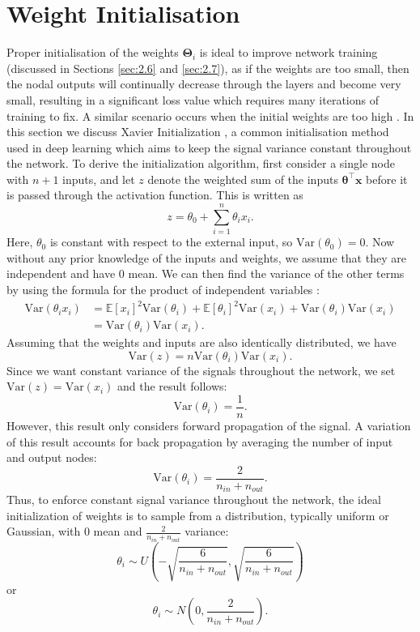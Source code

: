 \documentclass[honours,12pt]{unswthesis}
\newcommand{\E}{\mathbb{E}}
\newcommand{\Var}{\mathrm{Var}}
\numberwithin{equation}{section}
\theoremstyle{definition}
\begin{document}
\section{Weight Initialisation}\label{sec:2.5}
Proper initialisation of the weights $\bm{\Theta}_i$ is ideal to improve network training (discussed in Sections \ref{sec:2.6} and \ref{sec:2.7}), as if the weights are too small, then the nodal outputs will continually decrease through the layers and become very small, resulting in a significant loss value which requires many iterations of training to fix. A similar scenario occurs when the initial weights are too high \citep{bishop}. In this section we discuss Xavier Initialization \citep{xavier}, a common initialisation method used in deep learning which aims to keep the signal variance constant throughout the network. To derive the initialization algorithm, first consider a single node with $n+1$ inputs, and let $z$ denote the weighted sum of the inputs $\bm{\theta}^\top\bm{x}$ before it is passed through the activation function. This is written as
\[z=\theta_0+\sum^n_{i=1}\theta_ix_i.\]
Here, $\theta_0$ is constant with respect to the external input, so $\Var(\theta_0)=0$. Now without any prior knowledge of the inputs and weights, we assume that they are independent and have 0 mean. We can then find the variance of the other terms by using the formula for the product of independent variables \citep{goodman}:
\begin{align*}
\Var(\theta_ix_i)&=\E[x_i]^2\Var(\theta_i)+\E[\theta_i]^2\Var(x_i)+\Var(\theta_i)\Var(x_i)\\
&=\Var(\theta_i)\Var(x_i).
\end{align*}
Assuming that the weights and inputs are also identically distributed, we have
\[\Var(z)=n\Var(\theta_i)\Var(x_i).\]
Since we want constant variance of the signals throughout the network, we set $\Var(z)=\Var(x_i)$ and the result follows:
\[\Var(\theta_i)=\frac1n.\]
However, this result only considers forward propagation of the signal. A variation of this result accounts for back propagation by averaging the number of input and output nodes:
\[\Var(\theta_i)=\frac{2}{n_{in}+n_{out}}.\]
Thus, to enforce constant signal variance throughout the network, the ideal initialization of weights is to sample from a distribution, typically uniform or Gaussian, with $0$ mean and $\frac{2}{n_{in}+n_{out}}$ variance:
\[\theta_i\sim U\left(-\sqrt{\frac{6}{n_{in}+n_{out}}},\sqrt{\frac{6}{n_{in}+n_{out}}}\right)\]
or
\[\theta_i\sim N\left(0,\frac{2}{n_{in}+n_{out}}\right).\]
\end{document}
